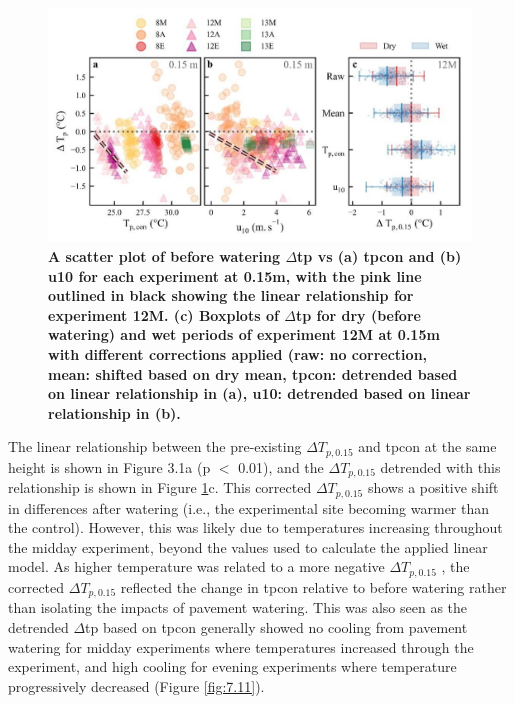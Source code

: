 \documentclass[final,3p,times,authoryear]{elsarticle}
\begin{document}
\begin{figure}
\centering
\includegraphics[trim={0 0 0 0},clip,scale=1.2]{pict011.jpg}
\caption{\bf A scatter plot of before watering $\Delta$\gls{tp} vs (a) \gls{tpcon} and (b) \gls{u10} for each experiment at 0.15m, with the pink line outlined in black showing the linear relationship for experiment 12M. (c) Boxplots of $\Delta$\gls{tp} for dry (before watering) and wet periods of experiment 12M at 0.15m with different corrections applied (raw: no correction, mean: shifted based on dry mean, \gls{tpcon}: detrended based on linear relationship in (a), \gls{u10}: detrended based on linear relationship in (b).}
 \label{fig:3.1}
\end{figure}

The linear relationship between the pre-existing $\Delta$$T_{p,0.15}$ and \gls{tpcon} at the same height is shown in Figure 3.1a (p $<$ 0.01), and the $\Delta$$T_{p,0.15}$ detrended with this relationship is shown in Figure \ref{fig:3.1}c. This corrected $\Delta$$T_{p,0.15}$ shows a positive shift in differences after watering (i.e., the experimental site becoming warmer than the control). However, this was likely due to temperatures increasing throughout the midday experiment, beyond the values used to calculate the applied linear model. As higher temperature was related to a more negative $\Delta$$T_{p,0.15}$ , the corrected $\Delta$$T_{p,0.15}$ reflected the change in \gls{tpcon} relative to before watering rather than isolating the impacts of pavement watering. This was also seen as the detrended $\Delta$\gls{tp} based on \gls{tpcon} generally showed no cooling from pavement watering for midday experiments where temperatures increased through the experiment, and high cooling for evening experiments where temperature progressively decreased (Figure \ref{fig:7.11}).
\end{document}
